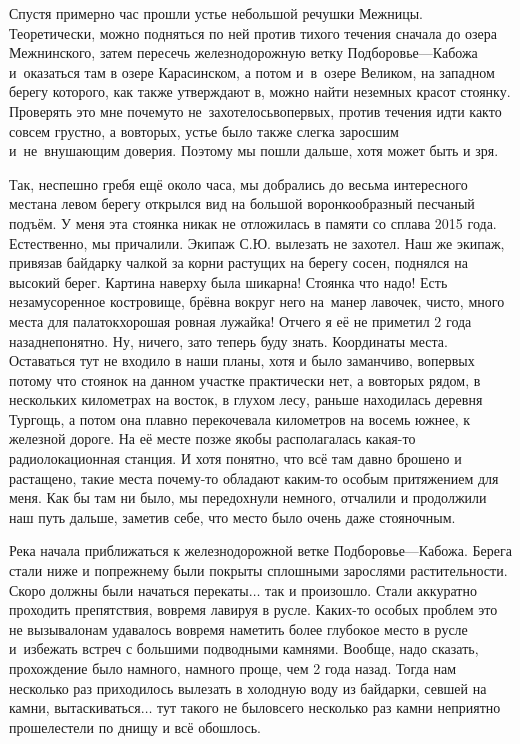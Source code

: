 Спустя примерно час прошли устье небольшой речушки Межницы. Теоретически, можно подняться по ней против тихого течения сначала до озера Межнинского, затем пересечь железнодорожную ветку Подборовье\thinspace\nobreakdash---\thinspace Кабожа и~оказаться там в озере Карасинском, а потом и~в~озере Великом, на западном берегу которого, как также утверждают в\cite{КатераиЯхтыЛидь}, можно найти неземных красот стоянку. Проверять это мне почему\sdash то не~захотелось\mdash во\sdash первых, против течения идти как\sdash то совсем грустно, а во\sdash вторых, устье было также слегка заросшим и~не~внушающим доверия. Поэтому мы пошли дальше, хотя может быть и зря.

Так, неспешно гребя ещё около часа, мы добрались до весьма интересного места\mdash на левом берегу открылся вид на большой воронкообразный песчаный подъём. У меня эта стоянка никак не отложилась в памяти со сплава 2015 года. Естественно, мы причалили. Экипаж С.Ю. вылезать не захотел. Наш же экипаж, привязав байдарку чалкой за корни растущих на берегу сосен, поднялся на высокий берег. Картина наверху была шикарна! Стоянка что надо! Есть незамусоренное костровище, брёвна вокруг него на~манер лавочек, чисто, много места для палаток\mdash хорошая ровная лужайка! Отчего я её не приметил 2 года назад\mdash непонятно. Ну, ничего, зато теперь буду знать. Координаты места\mdash \CoordsLidSuperPlace. Оставаться тут не входило в наши планы, хотя и было заманчиво, во\sdash первых потому что стоянок на данном участке практически нет, а во\sdash вторых рядом, в нескольких километрах на восток, в глухом лесу, раньше находилась деревня Тургощь, а потом она плавно перекочевала километров на восемь южнее, к железной дороге. На её месте позже якобы располагалась какая-то радиолокационная станция. И хотя понятно, что всё там давно брошено и растащено, такие места почему-то обладают каким-то особым притяжением для меня. Как бы там ни было, мы передохнули немного, отчалили и продолжили наш путь дальше, заметив себе, что место было очень даже стояночным.

Река начала приближаться к железнодорожной ветке Подборовье\thinspace---\thinspace Кабожа. Берега стали ниже и по\sdash прежнему были покрыты сплошными зарослями растительности. Скоро должны были начаться перекаты$\ldots$ так и произошло. Стали аккуратно проходить препятствия, вовремя лавируя в русле. Каких-то особых проблем это не вызывало\mdash нам удавалось вовремя наметить более глубокое место в русле и~избежать встреч с большими подводными камнями. Вообще, надо сказать, прохождение было намного, намного проще, чем 2 года назад. Тогда нам несколько раз приходилось вылезать в холодную воду из байдарки, севшей на камни, вытаскиваться$\ldots$ тут такого не было\mdash всего несколько раз камни неприятно прошелестели по днищу и всё обошлось. 

